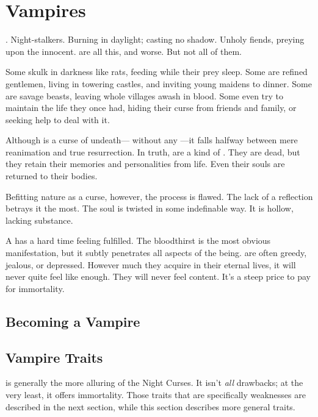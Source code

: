 \chapter{Vampires}

.
Night-stalkers.
Burning in daylight; casting no shadow.
Unholy fiends, preying upon the innocent.
{\vampires} are all this, and worse.
But not all of them.

Some skulk in darkness like rats, feeding while their prey sleep.
Some are refined gentlemen, living in towering castles, and inviting young maidens to dinner.
Some are savage beasts, leaving whole villages awash in blood.
Some even try to maintain the life they once had, hiding their curse from friends and family, or seeking help to deal with it.

Although {\vampirism} is a curse of undeath--- without any ---it falls halfway between mere reanimation and true resurrection.
In truth, {\vampires} are a kind of .
They are dead, but they retain their memories and personalities from life.
Even their souls are returned to their bodies.

Befitting {\vampirismpossessive} nature as a curse, however, the process is flawed.
The lack of a reflection betrays it the most.
The {\vampirepossessive} soul is twisted in some indefinable way.
It is hollow, lacking substance.

A {\vampire} has a hard time feeling fulfilled.
The bloodthirst is the most obvious manifestation, but it subtly penetrates all aspects of the {\vampirepossessive} being.
{\vampires} are often greedy, jealous, or depressed.
However much they acquire in their eternal lives, it will never quite feel like enough.
They will never feel content.
It's a steep price to pay for immortality.

\section{Becoming a Vampire}



\section{Vampire Traits}

{\vampirism} is generally the more alluring of the Night Curses.
It isn't \emph{all} drawbacks; at the very least, it offers immortality.
Those traits that are specifically weaknesses are described in the next section, while this section describes more general traits.

